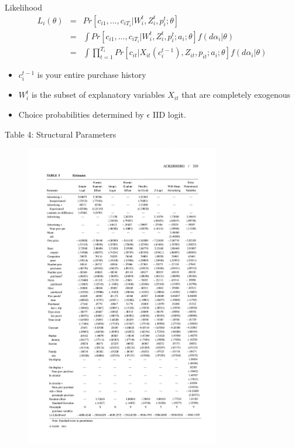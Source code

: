 \documentclass[xcolor=pdftex,dvipsnames,table,mathserif]{beamer}
\begin{document}
\begin{frame}{Likelihood}
\begin{eqnarray*}
L_i(\theta) &=& Pr[c_{i1},\ldots,c_{iT_i} | W_i^t, Z_i^t, p_i^t; \theta] \\
&=& \int Pr[c_{i1},\ldots,c_{iT_i} | W_i^t, Z_i^t, p_i^t; a_i;  \theta] f(d \alpha_i | \theta)\\
&=& \int \prod_{t=1}^{T_i} Pr[c_{it}|  X_{it}(c_{i}^{t-1}), Z_{it}, p_{it}; a_i;  \theta] f(d \alpha_i | \theta)
\end{eqnarray*}
\begin{itemize}
\item $c_{i}^{t-1}$ is your entire purchase history
\item $W_{i}^t$ is the subset of explanatory variables $X_{it}$ that are completely exogenous
\item Choice probabilities determined by $\epsilon$ IID logit.
\end{itemize}
\end{frame}

\begin{frame}{Table 4: Structural Parameters}
\begin{figure}[htbp]
\begin{center}
\includegraphics[width=8.5cm]{resources/acker4.pdf}
\label{default}
\end{center}
\end{figure}
\end{frame}
\end{document}
